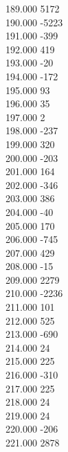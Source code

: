 { 189.000	5172 \\
 190.000	-5223 \\
 191.000	-399 \\
 192.000	419 \\
 193.000	-20 \\
 194.000	-172 \\
 195.000	93 \\
 196.000	35 \\
 197.000	2 \\
 198.000	-237 \\
 199.000	320 \\
 200.000	-203 \\
 201.000	164 \\
 202.000	-346 \\
 203.000	386 \\
 204.000	-40 \\
 205.000	170 \\
 206.000	-745 \\
 207.000	429 \\
 208.000	-15 \\
 209.000	2279 \\
 210.000	-2236 \\
 211.000	101 \\
 212.000	525 \\
 213.000	-690 \\
 214.000	24 \\
 215.000	225 \\
 216.000	-310 \\
 217.000	225 \\
 218.000	24 \\
 219.000	24 \\
 220.000	-206 \\
 221.000	2878 \\
}
